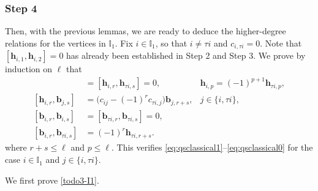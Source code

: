 \documentclass[11pt,reqno]{amsart}
\numberwithin{equation}{section}
\theoremstyle{definition}
\theoremstyle{remark}
\newcommand{\bb}{\mathbf{b}}
\newcommand{\bh}{\mathbf{h}}
\newcommand{\lle}{\leqslant}
\newcommand{\I}{{\mathbb I}}
\begin{document}
\subsubsection*{\bf Step 4}
Then, with the previous lemmas, we are ready to deduce the higher-degree
relations for the vertices in $\I_1$. Fix $i\in\I_1$, so that
$i\neq\tau i$ and $c_{i,\tau i}=0$. Note that
$[\bh_{i,1},\bh_{i,2}]=0$ has already been established in Step 2 and Step 3. We prove by
induction on $\ell$ that
\begin{align}
[\bh_{i,r},\bh_{i,s}]&=[\bh_{i,r},\bh_{\tau i,s}]=0,
&\bh_{i,p}=(-1)^{p+1}\bh_{\tau i,p},
\label{todo1-I1}
\\
[\bh_{i,r},\bb_{j,s}]&=
\big(c_{ij}-(-1)^r c_{\tau i,j}\big)\bb_{j,r+s},
&j\in\{i,\tau i\},
\label{todo2-I1}
\\
[\bb_{i,r},\bb_{i,s}]&=[\bb_{\tau i,r},\bb_{\tau i,s}]=0,
\label{todo3-I1}
\\
[\bb_{i,r},\bb_{\tau i,s}]&=(-1)^r\bh_{\tau i,r+s}.
\label{todo4-I1}
\end{align}
where $r+s\lle \ell$ and $p\lle \ell$. This verifies \eqref{eq:qsclassical1}--\eqref{eq:qsclassical0} for the case $i\in \I_1$ and $j\in \{i,\tau i\}$.


We first prove \eqref{todo3-I1}.
\end{document}
